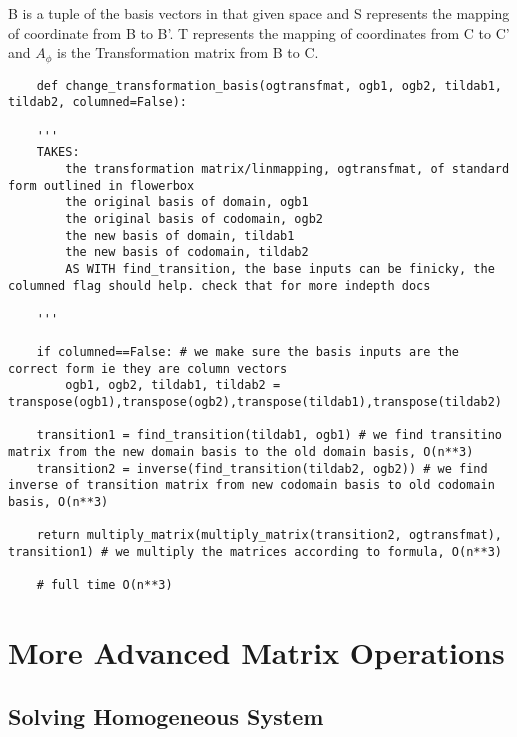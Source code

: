 \documentclass[12pt, a4paper]{article}
\begin{document}
B is a tuple of the basis vectors in that given space and S represents the mapping of coordinate from B to B'.
T represents the mapping of coordinates from C to C' and $A_{\phi}$ is the Transformation matrix from B to C.
\begin{lstlisting}
    def change_transformation_basis(ogtransfmat, ogb1, ogb2, tildab1, tildab2, columned=False):
    
    '''
    TAKES:
        the transformation matrix/linmapping, ogtransfmat, of standard form outlined in flowerbox
        the original basis of domain, ogb1
        the original basis of codomain, ogb2
        the new basis of domain, tildab1
        the new basis of codomain, tildab2
        AS WITH find_transition, the base inputs can be finicky, the columned flag should help. check that for more indepth docs

    '''

    if columned==False: # we make sure the basis inputs are the correct form ie they are column vectors
        ogb1, ogb2, tildab1, tildab2 = transpose(ogb1),transpose(ogb2),transpose(tildab1),transpose(tildab2) 

    transition1 = find_transition(tildab1, ogb1) # we find transitino matrix from the new domain basis to the old domain basis, O(n**3)
    transition2 = inverse(find_transition(tildab2, ogb2)) # we find inverse of transition matrix from new codomain basis to old codomain basis, O(n**3)

    return multiply_matrix(multiply_matrix(transition2, ogtransfmat), transition1) # we multiply the matrices according to formula, O(n**3)

    # full time O(n**3)
\end{lstlisting}



\section{More Advanced Matrix Operations}

\subsection{Solving Homogeneous System}
\end{document}
